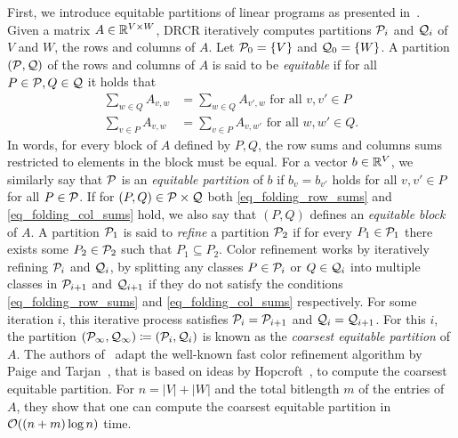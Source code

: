 \documentclass[pdflatex,sn-mathphys-num]{sn-jnl}%
\theoremstyle{thmstyleone}%
\theoremstyle{thmstylethree}%
\theoremstyle{thmstyletwo}%
\begin{document}
First, we introduce equitable partitions of linear programs as presented in~\cite{Grohe2014}. 
Given a matrix $A\in \mathbb{R}^{V\times W}$, DRCR iteratively computes partitions $\mathcal{P}_i$ and $\mathcal{Q}_i$ of $V$ and $W$, the rows and columns of $A$. Let $\mathcal{P}_0 = \{ V\}$ and $\mathcal{Q}_0 = \{ W\}$. 
A partition $(\mathcal{P},\mathcal{Q})$ of the rows and columns of $A$ is said to be \emph{equitable} if for all $P\in \mathcal{P},Q\in\mathcal{Q}$ it holds that
\begin{align}
    \label{eq_folding_row_sums}
    \sum_{w\in Q} A_{v,w} &= \sum_{w\in Q} A_{v',w}\text{ for all } v,v'\in P\\
    \label{eq_folding_col_sums}
    \sum_{v\in P} A_{v,w} &= \sum_{v\in P} A_{v,w'}\text{ for all } w,w'\in Q.
\end{align} In words, for every block of $A$ defined by $P,Q$, the row sums and columns sums restricted to elements in the block must be equal. For a vector $b\in \mathbb{R}^V$, we similarly say that $\mathcal{P}$ is an \emph{equitable partition} of $b$ if $b_v = b_{v'}$ holds for all $v,v'\in P$ for all $P\in \mathcal{P}$. If for $(P,Q)\in \mathcal{P} \times \mathcal{Q}$ both \eqref{eq_folding_row_sums} and \eqref{eq_folding_col_sums} hold, we also say that $(P,Q)$ defines an \emph{equitable block} of $A$. A partition $\mathcal{P}_1$ is said to \emph{refine} a partition $\mathcal{P}_2$ if for every $P_1\in \mathcal{P}_1$ there exists some $P_2\in \mathcal{P}_2$ such that $P_1\subseteq P_2$. Color refinement works by iteratively refining $\mathcal{P}_i$ and $\mathcal{Q}_i$, by splitting any classes $P\in \mathcal{P}_i$ or $Q\in\mathcal{Q}_i$ into multiple classes in $\mathcal{P}_{i+1}$ and $\mathcal{Q}_{i+1}$ if they do not satisfy the conditions \eqref{eq_folding_row_sums} and \eqref{eq_folding_col_sums} respectively. For some iteration $i$, this iterative process satisfies $\mathcal{P}_i = \mathcal{P}_{i+1}$ and $\mathcal{Q}_i = \mathcal{Q}_{i+1}$. For this $i$,
the partition $(\MP_\infty,\MQ_\infty) \coloneqq (\MP_i,\MQ_i)$ is known as the \emph{coarsest equitable partition} of $A$. The authors of~\cite{Grohe2014} adapt the well-known fast color refinement algorithm by Paige and Tarjan~\cite{Paige1987}, that is based on ideas by Hopcroft~\cite{Hopcroft1971}, to compute the coarsest equitable partition. For $n = |V| + |W|$ and the total bitlength $m$ of the entries of $A$, they show that one can compute the coarsest equitable partition in $\orderO((n+m)\log n)$ time. \\
\end{document}

